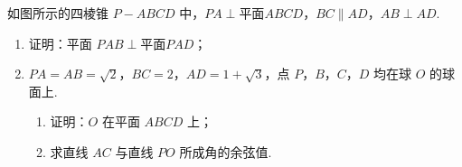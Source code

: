 \begin{problem}
如图所示的四棱锥 \(P - ABCD\) 中，\(PA \perp \text{平面} ABCD\)，\(BC \parallel AD\)，\(AB \perp AD\).

\begin{enumerate}
\item 证明：平面 \(PAB \perp \text{平面} PAD\)；
\item \(PA = AB = \sqrt{2}\)，\(BC = 2\)，\(AD = 1 + \sqrt{3}\)，点 \(P\)，\(B\)，\(C\)，\(D\) 均在球 \(O\) 的球面上.
\begin{enumerate}
\item 证明：\(O\) 在平面 \(ABCD\) 上；
\item 求直线 \(AC\) 与直线 \(PO\) 所成角的余弦值.
\end{enumerate}
\end{enumerate}

\end{problem}

